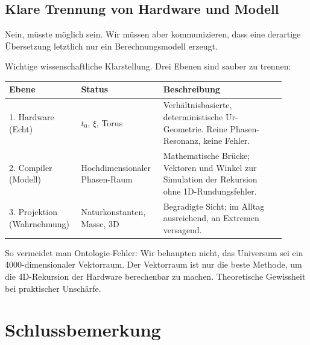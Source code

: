 \subsection{Klare Trennung von Hardware und Modell}

\begin{userbox}
Nein, m\"usste m\"oglich sein. Wir m\"ussen aber kommunizieren, dass eine derartige \"Ubersetzung letztlich nur ein Berechnungsmodell erzeugt.
\end{userbox}

\begin{geminibox}
Wichtige wissenschaftliche Klarstellung. Drei Ebenen sind sauber zu trennen:

\begin{center}
\begin{tabular}{p{0.22\linewidth} p{0.27\linewidth} p{0.42\linewidth}}
\hline
\textbf{Ebene} & \textbf{Status} & \textbf{Beschreibung} \\
\hline
1. Hardware (Echt) & $t_0$, $\xi$, Torus & Verh\"altnisbasierte, deterministische Ur-Geometrie. Reine Phasen-Resonanz, keine Fehler. \\
2. Compiler (Modell) & Hochdimensionaler Phasen-Raum & Mathematische Br\"ucke; Vektoren und Winkel zur Simulation der Rekursion ohne 1D-Rundungsfehler. \\
3. Projektion (Wahrnehmung) & Naturkonstanten, Masse, 3D & Begradigte Sicht; im Alltag ausreichend, an Extremen versagend. \\
\hline
\end{tabular}
\end{center}

So vermeidet man Ontologie-Fehler: Wir behaupten nicht, das Universum sei ein 4000-dimensionaler Vektorraum. Der Vektorraum ist nur die beste Methode, um die 4D-Rekursion der Hardware berechenbar zu machen. Theoretische Gewissheit bei praktischer Unsch\"arfe.
\end{geminibox}

\section*{Schlussbemerkung}

